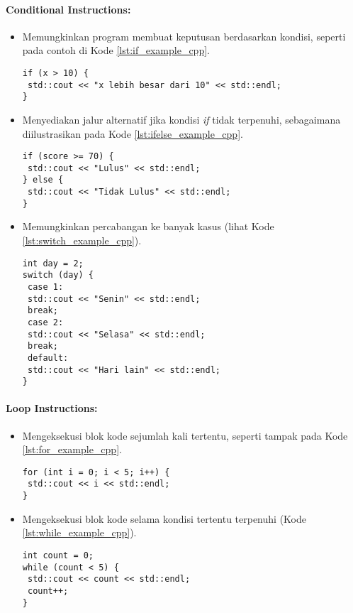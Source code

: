 \paragraph{Conditional Instructions:}
\begin{itemize}
	\item {} Memungkinkan program membuat keputusan berdasarkan kondisi, seperti pada contoh di Kode \ref{lst:if_example_cpp}.
	      \begin{verbatim}     
if (x > 10) {
 std::cout << "x lebih besar dari 10" << std::endl;
}
    \end{verbatim}
    \label{lst:if_example_cpp}

	\item {} Menyediakan jalur alternatif jika kondisi \textit{if} tidak terpenuhi, sebagaimana diilustrasikan pada Kode \ref{lst:ifelse_example_cpp}.
	      \begin{verbatim}     
if (score >= 70) {
 std::cout << "Lulus" << std::endl;
} else {
 std::cout << "Tidak Lulus" << std::endl;
}
    \end{verbatim}
    \label{lst:ifelse_example_cpp}

	\item {} Memungkinkan percabangan ke banyak kasus (lihat Kode \ref{lst:switch_example_cpp}).
	      \begin{verbatim}     
int day = 2;
switch (day) {
 case 1:
 std::cout << "Senin" << std::endl;
 break;
 case 2:
 std::cout << "Selasa" << std::endl;
 break;
 default:
 std::cout << "Hari lain" << std::endl;
}
    \end{verbatim}
    \label{lst:switch_example_cpp}
\end{itemize}

\paragraph{Loop Instructions:}
\begin{itemize}
	\item {} Mengeksekusi blok kode sejumlah kali tertentu, seperti tampak pada Kode \ref{lst:for_example_cpp}.
	      \begin{verbatim}     
for (int i = 0; i < 5; i++) {
 std::cout << i << std::endl;
}
    \end{verbatim}
    \label{lst:for_example_cpp}

	\item {} Mengeksekusi blok kode selama kondisi tertentu terpenuhi (Kode \ref{lst:while_example_cpp}).
	      \begin{verbatim}     
int count = 0;
while (count < 5) {
 std::cout << count << std::endl;
 count++;
}
    \end{verbatim}
    \label{lst:while_example_cpp}
\end{itemize}

